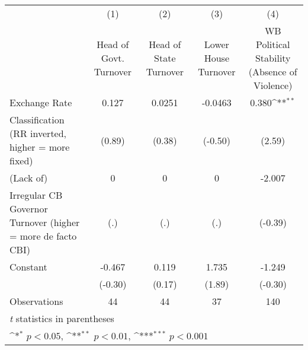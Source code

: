 {
\def\sym#1{\ifmmode^{#1}\else\(^{#1}\)\fi}
\begin{tabular}{l*{4}{c}}
\toprule
                &\multicolumn{1}{c}{(1)}&\multicolumn{1}{c}{(2)}&\multicolumn{1}{c}{(3)}&\multicolumn{1}{c}{(4)}\\
                &\multicolumn{1}{c}{Head of Govt. Turnover}&\multicolumn{1}{c}{Head of State Turnover}&\multicolumn{1}{c}{Lower House Turnover}&\multicolumn{1}{c}{WB Political Stability (Absence of Violence)}\\
\midrule
Exchange Rate   &    0.127         &   0.0251         &  -0.0463         &    0.380\sym{**} \\
Classification (RR inverted, higher = more fixed)&   (0.89)         &   (0.38)         &  (-0.50)         &   (2.59)         \\
\addlinespace
(Lack of)       &        0         &        0         &        0         &   -2.007         \\
Irregular CB Governor Turnover (higher = more de facto CBI)&      (.)         &      (.)         &      (.)         &  (-0.39)         \\
\addlinespace
Constant        &   -0.467         &    0.119         &    1.735         &   -1.249         \\
                &  (-0.30)         &   (0.17)         &   (1.89)         &  (-0.30)         \\
\midrule
Observations    &       44         &       44         &       37         &      140         \\
\bottomrule
\multicolumn{5}{l}{\footnotesize \textit{t} statistics in parentheses}\\
\multicolumn{5}{l}{\footnotesize \sym{*} \(p<0.05\), \sym{**} \(p<0.01\), \sym{***} \(p<0.001\)}\\
\end{tabular}
}
